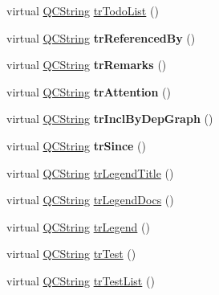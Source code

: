\begin{DoxyCompactItemize}
\item 
virtual \mbox{\hyperlink{class_q_c_string}{Q\+C\+String}} \mbox{\hyperlink{class_translator_chinese_ae8d694cf334f108ed16a5f2740bdcf1e}{tr\+Todo\+List}} ()
\item 
\mbox{\label{class_translator_chinese_ac819db4bea6320faffd8f5c002ea327c}} 
virtual \mbox{\hyperlink{class_q_c_string}{Q\+C\+String}} {\bfseries tr\+Referenced\+By} ()
\item 
\mbox{\label{class_translator_chinese_a5a179afdd40fce61ad5ef8f050f475ff}} 
virtual \mbox{\hyperlink{class_q_c_string}{Q\+C\+String}} {\bfseries tr\+Remarks} ()
\item 
\mbox{\label{class_translator_chinese_af4f9fa0336b57affefb2d0f347d1da47}} 
virtual \mbox{\hyperlink{class_q_c_string}{Q\+C\+String}} {\bfseries tr\+Attention} ()
\item 
\mbox{\label{class_translator_chinese_a80eaa84dfd8ac3f9ec4ae4d8ac0d5341}} 
virtual \mbox{\hyperlink{class_q_c_string}{Q\+C\+String}} {\bfseries tr\+Incl\+By\+Dep\+Graph} ()
\item 
\mbox{\label{class_translator_chinese_af19c471558edbe8806c99a2f8cc1482d}} 
virtual \mbox{\hyperlink{class_q_c_string}{Q\+C\+String}} {\bfseries tr\+Since} ()
\item 
virtual \mbox{\hyperlink{class_q_c_string}{Q\+C\+String}} \mbox{\hyperlink{class_translator_chinese_a51037e46ac3ff06aff64477f0a3593ac}{tr\+Legend\+Title}} ()
\item 
virtual \mbox{\hyperlink{class_q_c_string}{Q\+C\+String}} \mbox{\hyperlink{class_translator_chinese_a4e368073ebc80e931ea9569c9ed39340}{tr\+Legend\+Docs}} ()
\item 
virtual \mbox{\hyperlink{class_q_c_string}{Q\+C\+String}} \mbox{\hyperlink{class_translator_chinese_ab6836224b061ca33dd7531e84db84127}{tr\+Legend}} ()
\item 
virtual \mbox{\hyperlink{class_q_c_string}{Q\+C\+String}} \mbox{\hyperlink{class_translator_chinese_a65fe10edd3047d2250a200f20c049f28}{tr\+Test}} ()
\item 
virtual \mbox{\hyperlink{class_q_c_string}{Q\+C\+String}} \mbox{\hyperlink{class_translator_chinese_a9c72ee75945f11881ed0bf37b050e15f}{tr\+Test\+List}} ()

\end{DoxyCompactItemize}
